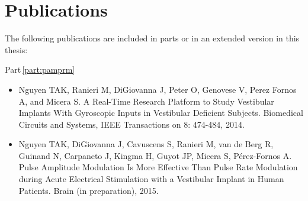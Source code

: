 \chapter*{Publications}

The following publications are included in parts or in an extended version in
this thesis:

Part\,\ref{part:pamprm}
\begin{itemize}
\item Nguyen TAK, Ranieri M, DiGiovanna J, Peter O, Genovese V, Perez Fornos A, and Micera S. A Real-Time Research Platform to Study Vestibular Implants With Gyroscopic Inputs in Vestibular Deficient Subjects. Biomedical Circuits and Systems, IEEE Transactions on 8: 474-484, 2014.

\item Nguyen TAK, DiGiovanna J, Cavuscens S, Ranieri M, van de Berg R, Guinand N, Carpaneto J, Kingma H, Guyot JP, Micera S, Pérez-Fornos A. Pulse Amplitude Modulation Is More Effective Than Pulse Rate Modulation during Acute Electrical Stimulation with a Vestibular Implant in Human Patients. Brain (in preparation), 2015.
\end{itemize}

